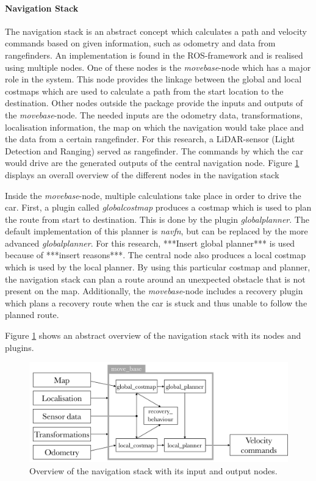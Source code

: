 \documentclass[conference,a4paper]{IEEEtran}
\begin{document}
\paragraph{Navigation Stack}
The navigation stack is an abstract concept which calculates a path and velocity commands based on given information, such as odometry and data from rangefinders. An implementation is found in the ROS-framework and is realised using multiple nodes. One of these nodes is the \emph{move\textunderscore base}-node which has a major role in the system. This node provides the linkage between the global and local costmaps which are used to calculate a path from the start location to the destination. Other nodes outside the package provide the inputs and outputs of the \emph{move\textunderscore base}-node. The needed inputs are the odometry data, transformations, localisation information, the map on which the navigation would take place and the data from a certain rangefinder. For this research, a LiDAR-sensor (Light Detection and Ranging) served as rangefinder. The commands by which the car would drive are the generated outputs of the central navigation node. Figure \ref{fig:navstack_global} displays an overall overview of the different nodes in the navigation stack

Inside the \textit{move\textunderscore base}-node, multiple calculations take place in order to drive the car. First, a plugin called \emph{global\textunderscore costmap} produces a costmap which is used to plan the route from start to destination. This is done by the plugin \emph{global\textunderscore planner}. The default implementation of this planner is \emph{navfn}, but can be replaced by the more advanced \emph{global\textunderscore planner}. For this research, ***Insert global planner*** is used because of ***insert reasons***. The central node also produces a local costmap which is used by the local planner. By using this particular costmap and planner, the navigation stack can plan a route around an unexpected obstacle that is not present on the map. Additionally, the \emph{move\textunderscore base}-node includes a recovery plugin which plans a recovery route when the car is stuck and thus unable to follow the planned route.

Figure \ref{fig:navstack_global} shows an abstract overview of the navigation stack with its nodes and plugins. 

\begin{figure}[!t]
    \includegraphics[width=\columnwidth]{navstack3}
    \centering
    \caption{Overview of the navigation stack with its input and output nodes.}
    \label{fig:navstack_global}
\end{figure}
\end{document}
